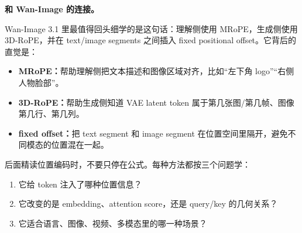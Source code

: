 \textbf{和 Wan-Image 的连接。}

Wan-Image 3.1 里最值得回头细学的是这句话：理解侧使用 MRoPE，生成侧使用 3D-RoPE，并在 text/image segments 之间插入 fixed positional offset。它背后的直觉是：

\begin{itemize}[leftmargin=1.5em]
  \item \textbf{MRoPE：}帮助理解侧把文本描述和图像区域对齐，比如“左下角 logo”“右侧人物脸部”。
  \item \textbf{3D-RoPE：}帮助生成侧知道 VAE latent token 属于第几张图/第几帧、图像第几行、第几列。
  \item \textbf{fixed offset：}把 text segment 和 image segment 在位置空间里隔开，避免不同模态的位置混在一起。
\end{itemize}

后面精读位置编码时，不要只停在公式。每种方法都按三个问题学：

\begin{enumerate}[leftmargin=1.8em]
  \item 它给 token 注入了哪种位置信息？
  \item 它改变的是 embedding、attention score，还是 query/key 的几何关系？
  \item 它适合语言、图像、视频、多模态里的哪一种场景？
\end{enumerate}
